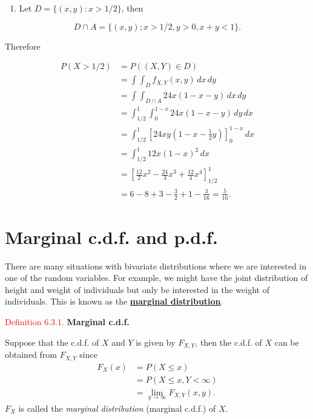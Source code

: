 \documentclass[
]{book}
\providecommand{\tightlist}{%
  \setlength{\itemsep}{0pt}\setlength{\parskip}{0pt}}
\begin{document}
\begin{enumerate}
\def\labelenumi{(\alph{enumi})}
\setcounter{enumi}{1}
\tightlist
\item
  Let \(D = \{ (x,y): x>1/2 \}\), then
\end{enumerate}

\[ D \cap A = \{ (x,y); x>1/2, y>0, x+y<1 \}.\]

Therefore

\begin{align*}
P(X>1/2) &= P((X,Y) \in D) \\
&= \int\int_D f_{X,Y}(x,y) \,dx \,dy \\
&= \int\int_{D \cap A} 24x(1-x-y) \,dx \,dy \\
&= \int_{1/2}^1 \int_0^{1-x} 24x(1-x-y) \,dy \,dx \\
&= \int_{1/2}^1 \left[ 24xy \left( 1 - x - \frac{1}{2}y \right) \right]_0^{1-x} \,dx \\
&= \int_{1/2}^1 12x(1-x)^2 \,dx \\
&= \left[ \frac{12}{2}x^2 - \frac{24}{3}x^3 + \frac{12}{4}x^4 \right]_{1/2}^1 \\
&= 6 - 8 +3 - \frac{3}{2} + 1 - \frac{3}{16} = \frac{5}{16}.
\end{align*}

\hfill\break

\hypertarget{jointdis:marginal}{%
\section{Marginal c.d.f. and p.d.f.}\label{jointdis:marginal}}

There are many situations with bivariate distributions where we are interested in one of the random variables. For example, we might have the joint distribution of height and weight of individuals but only be interested in the weight of individuals. This is known as the \protect\hyperlink{jointdis:def:marginal}{\textbf{marginal distribution}}.

\leavevmode{}%
\textcolor{red}{Definition 6.3.1.}
{\textbf{Marginal c.d.f.}}

Suppose that the c.d.f. of \(X\) and \(Y\) is given by \(F_{X,Y}\), then the c.d.f. of \(X\) can be obtained from \(F_{X,Y}\) since
\begin{align*}
F_X(x) &= P(X \leq x) \\
&=P( X \leq x, Y<\infty ) \\
&= \lim_{y\rightarrow\infty} F_{X,Y}(x,y).
\end{align*}
\(F_X\) is called the \emph{marginal distribution} (marginal c.d.f.) of \(X\).
\end{document}
